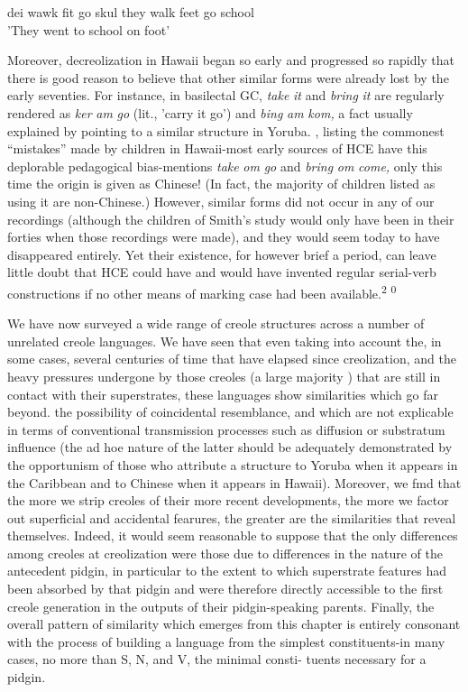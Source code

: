 \ea\label{ex:264}
 dei wawk fit go skul they walk feet go school\\
\glt'They went to school on foot'
\z



Moreover, decreolization in Hawaii began so early and progressed so rapidly that there is good reason to believe that other similar forms were already lost by the early seventies. For instance, in basilectal GC, \textit{take} \textit{it} and \textit{bring} \textit{it} are regularly rendered as \textit{ker} \textit{am} \textit{go }(lit., 'carry it go') and \textit{bi}\textit{n}\textit{g} \textit{am} \textit{k}\textit{om,} a fact usually explained by pointing to a similar structure in Yoruba. \citet{Smith1939}, listing the commonest ``mistakes''
made by children in Hawaii-most early sources of HCE have this deplorable pedagogical bias-mentions \textit{take} \textit{om} \textit{go} and \textit{bring} \textit{om} \textit{come,} only this time the origin is given as Chinese! (In fact, the majority of children listed as using it are non-Chinese.) However, similar forms did not occur in any of our recordings (although the children of Smith's study would only have been in their forties when those recordings were made), and they would seem today to have disappeared entirely. Yet their existence, for however brief a period, can leave little doubt that HCE could have and would have invented regular serial-verb constructions if no other means of marking case had been available.\textsuperscript{2} \textsuperscript{0}

We have now surveyed a wide range of creole structures across a number of unrelated creole languages. We have seen that even taking into account the, in some cases, several centuries of time that have elapsed since creolization, and the heavy pressures undergone by those creoles (a large majority ) that are still in contact with their superstrates, these languages show similarities which go far beyond. the possibility of coincidental resemblance, and which are not explicable in terms of conventional transmission processes such as diffusion or substratum influence (the ad hoe nature of the latter should be ade\-quately demonstrated by the opportunism of those who attribute a structure to Yoruba when it appears in the Caribbean and to Chinese when it appears in Hawaii). Moreover, we fmd that the more we strip creoles of their more recent developments, the more we factor out superficial and accidental fearures, the greater are the similarities that reveal themselves. Indeed, it would seem reasonable to suppose that the only differences among creoles at creolization were those due to differences in the nature of the antecedent pidgin, in particular to the extent to which superstrate features had been absorbed by that pidgin and were therefore directly accessible to the first creole generation in the outputs of their pidgin-speaking parents. Finally, the overall pattern of similarity which emerges from this chapter is entirely conso\-nant with the process of building a language from the simplest consti\-tuents-in many cases, no more than S, N, and V, the minimal consti{}- tuents necessary for a pidgin. 


